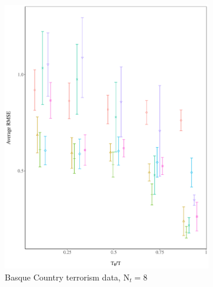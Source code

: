 \documentclass[hidelinks,12pt]{article}
\begin{document}
\begin{figure}[htbp]
	\centering
	\begin{subfigure}[t]{0.48\textwidth}
		\centering
		\includegraphics[width=\textwidth]{plots/basque-stag.png}
		\caption{Basque Country terrorism data, $\text{N}_t = 8$} 
	\end{subfigure}
	~ 
	\begin{subfigure}[t]{0.48\textwidth}
		\centering

\end{subfigure}
\end{figure}
\end{document}
